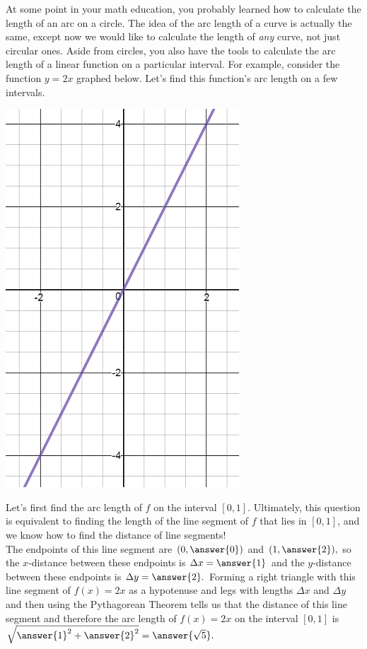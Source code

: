 \documentclass[handout,nooutcomes]{ximera}
\begin{document}
At some point in your math education, you probably learned how to calculate the length of an arc on a circle.  The idea of the arc length of a curve is actually the same, except now we would like to calculate the length of \textit{any} curve, not just circular ones.  Aside from circles, you also have the tools to calculate the arc length of a linear function on a particular interval.  For example, consider the function $y = 2x$ graphed below.  Let's find this function's arc length on a few intervals.  

\begin{center} \includegraphics{2x.png} \end{center}

\begin{problem}
Let's first find the arc length of $f$ on the interval $[0,1]$.  Ultimately, this question is equivalent to finding the length of the line segment of $f$ that lies in $[0,1]$, and we know how to find the distance of line segments!  \\ 

The endpoints of this line segment are $(0,\answer{0})$ and $(1,\answer{2}),$ so the $x$-distance between these endpoints is $\Delta x = \answer{1}$ and the $y$-distance between these endpoints is $\Delta y = \answer{2}.$  Forming a right triangle with this line segment of $f(x) = 2x$ as a hypotenuse and legs with lengths $\Delta x$ and $\Delta y$  and then using the Pythagorean Theorem tells us that the distance of this line segment and therefore the arc length of $f(x) = 2x$ on the interval $[0,1]$ is $\sqrt{{\answer{1}}^2+{\answer{2}}^2} = \answer{\sqrt{5}}.$
\end{problem}
\end{document}
